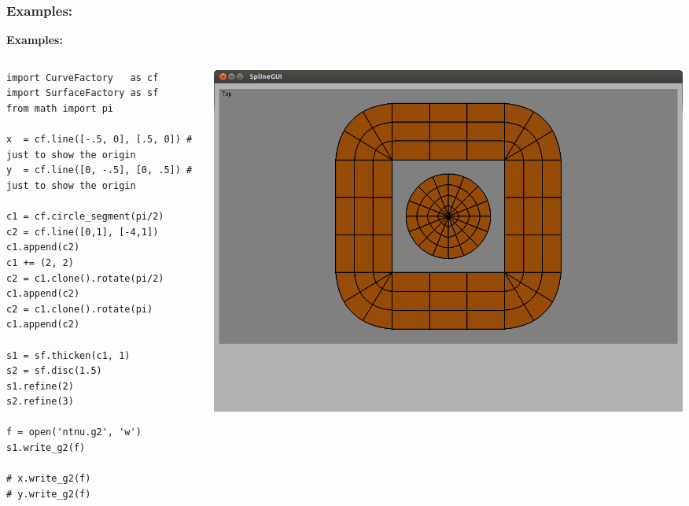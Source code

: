 \documentclass{beamer}
\theoremstyle{plain}
\theoremstyle{definition}
\begin{document}
\begin{frame}[fragile]
\frametitle{Examples:}
\textbf{Examples:}
\begin{columns}
    \begin{column}{.50\linewidth}
        \begin{listing}[H]
            \tiny
            \begin{verbatim}
import CurveFactory   as cf
import SurfaceFactory as sf
from math import pi

x  = cf.line([-.5, 0], [.5, 0]) # just to show the origin
y  = cf.line([0, -.5], [0, .5]) # just to show the origin

c1 = cf.circle_segment(pi/2)
c2 = cf.line([0,1], [-4,1])
c1.append(c2)
c1 += (2, 2)
c2 = c1.clone().rotate(pi/2)
c1.append(c2)
c2 = c1.clone().rotate(pi)
c1.append(c2)

s1 = sf.thicken(c1, 1)
s2 = sf.disc(1.5)
s1.refine(2)
s2.refine(3)

f = open('ntnu.g2', 'w')
s1.write_g2(f)

# x.write_g2(f)
# y.write_g2(f)
            \end{verbatim}
        \end{listing}
    \end{column}
    \begin{column}{.45\linewidth}
        \includegraphics[width=\linewidth]{ntnu5}
    \end{column}
\end{columns}

\end{frame}

\end{document}
